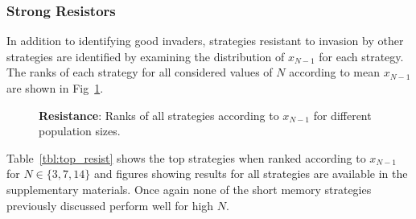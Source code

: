 \documentclass[10pt,letterpaper]{article}
\begin{document}
\subsubsection*{Strong Resistors}

In addition to identifying good invaders, strategies resistant to invasion by
other strategies are identified by examining the distribution of $x_{N-1}$ for
each strategy. The ranks of each strategy for all considered values of \(N\)
according to mean \(x_{N-1}\) are shown in Fig~\ref{fig:ranks_v_size_resist}.

\begin{figure}[!hbtp]
    \centering
    \caption{\textbf{Resistance}: Ranks of all strategies according to \(x_{N-1}\) for different
    population sizes.}
    \label{fig:ranks_v_size_resist}
\end{figure}


Table~\ref{tbl:top_resist} shows the top strategies when ranked
according to \(x_{N-1}\) for \(N\in\{3, 7, 14\}\) and figures showing results
for all strategies are available in the supplementary materials.
Once again none of the short memory strategies previously discussed perform well
for high \(N\).
\end{document}
